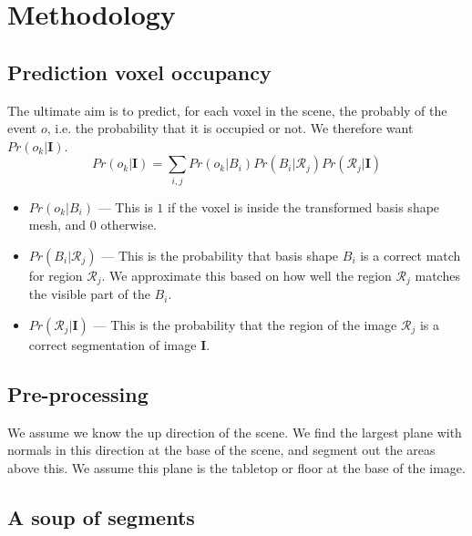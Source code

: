 \documentclass[10pt,a4paper, twocolumn]{article}
\makeatletter
\newcommand*{\ie}{i.e.\@\xspace}
\newcommand{\prob}{Pr}
\newcommand{\rgbdimage}{\mathbf{I}}
\newcommand{\imregion}{\mathcal{R}}
\newcommand{\occ}{o}
\newcommand{\basisshape}{B}
\makeatother
\begin{document}
\section{Methodology}


\subsection{Prediction voxel occupancy}
The ultimate aim is to predict, for each voxel in the scene, the probably of the event $\occ$, \ie the probability that it is occupied or not. We therefore want $\prob(\occ_k | \rgbdimage)$.
$$
\prob(\occ_k | \rgbdimage) = \sum_{i,j} \prob(\occ_k|\basisshape_i)\prob(\basisshape_i|\imregion_j)\prob(\imregion_j|\rgbdimage)
$$

\begin{itemize}
\item $\prob(\occ_k|\basisshape_i)$ ---
This is $1$ if the voxel is inside the transformed basis shape mesh, and $0$ otherwise.
\item $\prob(\basisshape_i|\imregion_j)$ ---
This is the probability that basis shape $\basisshape_i$ is a correct match for region $\imregion_j$. We approximate this based on how well the region $\imregion_j$ matches the visible part of the $\basisshape_i$.
\item $\prob(\imregion_j|\rgbdimage)$ ---
This is the probability that the region of the image $\imregion_j$ is a correct segmentation of image $\rgbdimage$.
\end{itemize}

\subsection{Pre-processing}
We assume we know the up direction of the scene. 
We find the largest plane with normals in this direction at the base of the scene, and segment out the areas above this.
We assume this plane is the tabletop or floor at the base of the image.


\subsection{A soup of segments}
\end{document}
